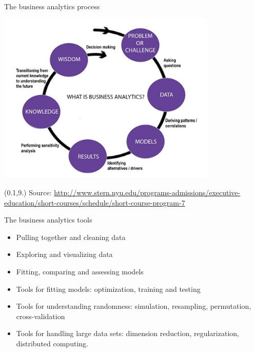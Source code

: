 \documentclass[14pt]{beamer}
\begin{document}
\begin{frame}{\large The business analytics process}

\centerline{\includegraphics[height=8.2cm]{BAprocess}}

\begin{textblock}{12.8}(0.1,9.)\fontsize{5}{7}\sffamily
Source: \url{http://www.stern.nyu.edu/programs-admissions/executive-education/short-courses/schedule/short-course-program-7}
\end{textblock}

\end{frame}


\begin{frame}{\large The business analytics tools}
\begin{itemize}
\item Pulling together and cleaning data
\item  Exploring and visualizing data
\item  Fitting, comparing and assessing models
\item  Tools for fitting models: optimization, training and testing
\item  Tools for understanding randomness: simulation, resampling, permutation, cross-validation
\item Tools for handling large data sets: dimension reduction, regularization, distributed computing.
\end{itemize}
\end{frame}
\end{document}
